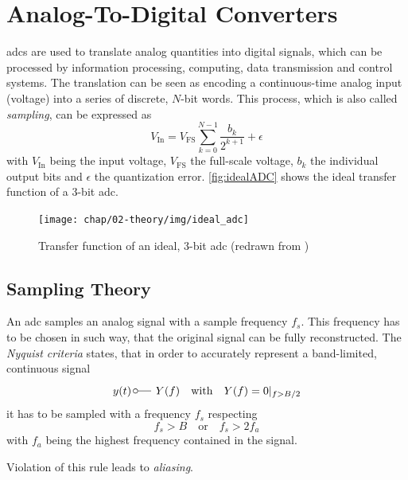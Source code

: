 \section{Analog-To-Digital Converters}
\Glspl{adc} are used to translate analog quantities into digital signals, which can be processed by information processing, computing, data transmission and control systems. The translation can be seen as encoding a continuous-time analog input (voltage) into a series of discrete, $N$-bit words. This process, which is also called \textit{sampling}, can be expressed as
\begin{equation}
	V_{\text{In}} = V_{\text{FS}} \sum_{k = 0}^{N-1} \frac{b_k}{2^{k+1}} + \epsilon
\end{equation}
with $V_{\text{In}}$ being the input voltage, $V_{\text{FS}}$ the full-scale voltage, $b_k$ the individual output bits and $\epsilon$ the quantization error. \autoref{fig:idealADC} shows the ideal transfer function of a 3-bit \gls{adc}.
\begin{figure}[H]
	\centering
	\texttt{[image: chap/02-theory/img/ideal\_adc]}
	\caption[Transfer function of ideal, 3-bit ADC]{Transfer function of an ideal, 3-bit \gls{adc} (redrawn from \cite{Lundberg})}
	\label{fig:idealADC}
\end{figure}

\subsection{Sampling Theory}
An \gls{adc} samples an analog signal with a sample frequency $f_s$.
This frequency has to be chosen in such way, that the original signal can be fully reconstructed.
The \textit{Nyquist criteria} states, that in order to accurately represent a band-limited, continuous signal %
\begin{equation}
	y (t) \, \fourier  Y(f) \quad \text{with} \quad Y(f)=0\vert_{f>B/2}
\end{equation}
it has to be sampled with a frequency $f_s$ respecting
\begin{equation}
	f_s > B \quad \text{or} \quad f_s > 2 f_a
\end{equation}
with $f_a$ being the highest frequency contained in the signal. \cite{walt,puente2015}

Violation of this rule leads to \textit{aliasing}.


